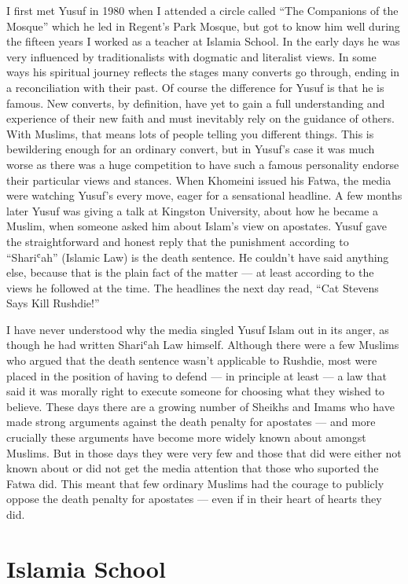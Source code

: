 \documentclass[12pt]{memoir}
\def\`{ʿ} %
\newcommand{\cor}[2]{#2} %
\begin{document}
I first met Yusuf in 1980 when I attended a circle called
“The Companions of the Mosque” which he led
in \cor{Regents}{Regent’s} Park Mosque,
but got to know him well during the fifteen years
I worked as a teacher at Islamia School.
In the early days he was very influenced by traditionalists
with dogmatic and literalist views.
In some ways his spiritual journey reflects the stages
many converts go through, ending in a reconciliation with their past.
Of course the difference for Yusuf is that he is famous.
New converts, by definition, have yet to gain a full understanding
and experience of their new faith
and must inevitably rely on the guidance of others.
With Muslims, that means lots of people telling you different things.
This is bewildering enough for an ordinary convert,
but in Yusuf’s case it was much worse as there was a huge competition
to have such a famous personality endorse their particular views and stances.
When Khomeini issued his Fatwa, the media were watching Yusuf’s every move,
eager for a sensational headline.
A few months later Yusuf was giving a talk at Kingston University,
about how he became a Muslim,
when someone asked him about Islam’s view on apostates.
Yusuf gave the straightforward and honest reply
that the punishment according to “Shari\`ah” (Islamic Law)
is the death sentence.
He couldn’t have said anything else,
because that is the plain fact of the matter —
at least according to the views he followed at the time.
The headlines the next day read, “Cat Stevens Says Kill Rushdie!”

I have never understood why the media singled Yusuf Islam out in its anger,
as though he had written Shari\`ah Law himself.
Although there were a few Muslims who argued that the death sentence
wasn’t applicable to Rushdie,
most were placed in the position of having to defend —
in principle at least —
a law that said it was morally right to execute someone
for choosing what they wished to believe.
These days there are a growing number of Sheikhs and Imams
who have made strong arguments against the death penalty for apostates —
and more crucially these arguments have become
more widely known about amongst Muslims.
But in those days they were very few and those that did
were either not known about or did not get
the media attention that those who suported the Fatwa did.
This meant that few ordinary Muslims had the courage
to publicly oppose the death penalty for apostates —
even if in their heart of hearts they did.


\chapter{Islamia School}
\end{document}
